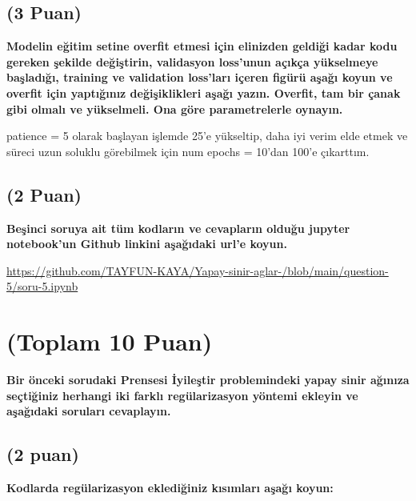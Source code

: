 \documentclass[11pt]{article}
\begin{document}
\subsection{(3 Puan)} \textbf{Modelin eğitim setine overfit etmesi için elinizden geldiği kadar kodu gereken şekilde değiştirin, validasyon loss'unun açıkça yükselmeye başladığı, training ve validation loss'ları içeren figürü aşağı koyun ve overfit için yaptığınız değişiklikleri aşağı yazın. Overfit, tam bir çanak gibi olmalı ve yükselmeli. Ona göre parametrelerle oynayın.}

patience = 5 olarak başlayan işlemde 25'e yükseltip, daha iyi verim elde etmek ve süreci 
uzun soluklu görebilmek için num epochs = 10'dan 100'e çıkarttım.

\begin{comment}
\begin{figure}[ht!]
    \centering
    \texttt{[image: mypicturehere.png]}
    \caption{Buraya açıklama yazın}
    \label{fig:my_pic}
\end{figure}
\end{comment}

\subsection{(2 Puan)} \textbf{Beşinci soruya ait tüm kodların ve cevapların olduğu jupyter notebook'un Github linkini aşağıdaki url'e koyun.}

\url{https://github.com/TAYFUN-KAYA/Yapay-sinir-aglar-/blob/main/question-5/soru-5.ipynb}

\section{(Toplam 10 Puan)} \textbf{Bir önceki sorudaki Prensesi İyileştir problemindeki yapay sinir ağınıza seçtiğiniz herhangi iki farklı regülarizasyon yöntemi ekleyin ve aşağıdaki soruları cevaplayın.} 

\subsection{(2 puan)} \textbf{Kodlarda regülarizasyon eklediğiniz kısımları aşağı koyun:} 
\end{document}
